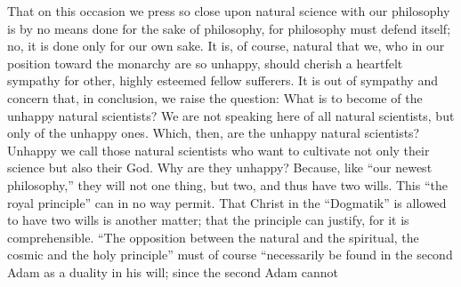 \documentclass[12pt]{book}
\newcommand{\opage}[1]{\marginnote{\footnotesize\textit{[#1]}}}
\begin{document}
That on this occasion we press so close upon natural science with our philosophy is by no means done for the sake of philosophy, for philosophy must defend itself; no, it is done only for our own sake. It is, of course, natural that we, who in our position toward the monarchy are so unhappy, should cherish a heartfelt sympathy for other, highly esteemed fellow sufferers. It is out of sympathy and concern that, in conclusion, we raise the question: What is to become of the unhappy natural scientists? We are not speaking here of all natural scientists, but only of the unhappy ones. Which, then, are the unhappy natural scientists? Unhappy we call those natural scientists who want to cultivate not only their science but also their God. Why are they unhappy? Because, like ``our newest philosophy,'' they will not one thing, but two, and thus have two wills. This ``the royal principle'' can in no way permit. That Christ in the ``Dogmatik'' is allowed to have two wills is another matter; that the principle can justify, for it is comprehensible. ``The opposition between the natural and the spiritual, the cosmic and the holy principle'' must of course ``necessarily be found in the second Adam as a duality in his will; since the second Adam cannot
\opage{39}\setcounter{footnote}{0}%
\end{document}
